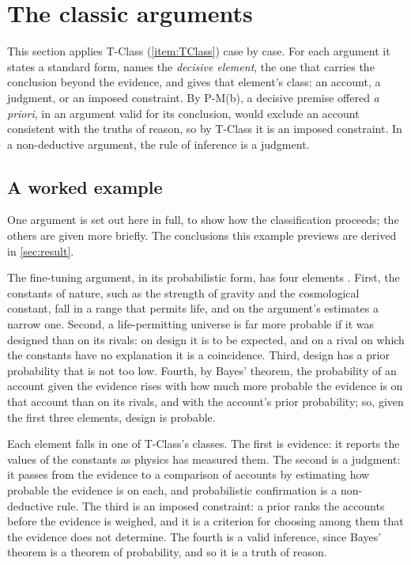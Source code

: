 \section{The classic arguments}\label{sec:arguments}

This section applies T-Class (\cref{item:TClass}) case by case. For each argument it states a
standard form, names the \emph{decisive element}, the one that carries the conclusion beyond the
evidence, and gives that element's class: an account, a judgment, or an imposed constraint. By
P-M(b), a decisive premise offered \emph{a priori}, in an argument valid for its conclusion, would
exclude an account consistent with the truths of reason, so by T-Class it is an imposed constraint.
In a non-deductive argument, the rule of inference is a judgment.

\subsection{A worked example}\label{ss:worked-example}

One argument is set out here in full, to show how the classification proceeds; the others are given
more briefly. The conclusions this example previews are derived in \cref{sec:result}.

The fine-tuning argument, in its probabilistic form, has four elements
\citep{swinburne2004,collins2009}. First, the constants of nature, such as the strength of gravity
and the cosmological constant, fall in a range that permits life, and on the argument's estimates a
narrow one. Second, a life-permitting universe is far more probable if it was designed than on its
rivals: on design it is to be expected, and on a rival on which the constants have no explanation it
is a coincidence. Third, design has a prior probability that is not too low. Fourth, by Bayes'
theorem, the probability of an account given the evidence rises with how much more probable the
evidence is on that account than on its rivals, and with the account's prior probability; so, given
the first three elements, design is probable.

Each element falls in one of T-Class's classes. The first is evidence: it reports the values of the
constants as physics has measured them. The second is a judgment: it passes from the evidence to a
comparison of accounts by estimating how probable the evidence is on each, and probabilistic
confirmation is a non-deductive rule. The third is an imposed constraint: a prior ranks the accounts
before the evidence is weighed, and it is a criterion for choosing among them that the evidence does
not determine. The fourth is a valid inference, since Bayes' theorem is a theorem of probability, and
so it is a truth of reason.

